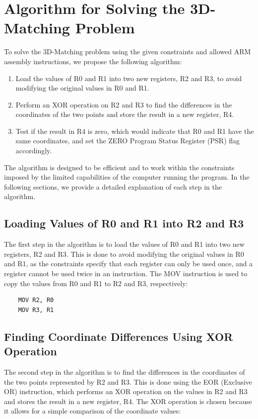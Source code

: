 \section{Algorithm for Solving the 3D-Matching Problem}

To solve the 3D-Matching problem using the given constraints and allowed ARM assembly instructions, we propose the following algorithm:

\begin{enumerate}
    \item Load the values of R0 and R1 into two new registers, R2 and R3, to avoid modifying the original values in R0 and R1.
    \item Perform an XOR operation on R2 and R3 to find the differences in the coordinates of the two points and store the result in a new register, R4.
    \item Test if the result in R4 is zero, which would indicate that R0 and R1 have the same coordinates, and set the ZERO Program Status Register (PSR) flag accordingly.
\end{enumerate}

The algorithm is designed to be efficient and to work within the constraints imposed by the limited capabilities of the computer running the program. In the following sections, we provide a detailed explanation of each step in the algorithm.

\subsection{Loading Values of R0 and R1 into R2 and R3}

The first step in the algorithm is to load the values of R0 and R1 into two new registers, R2 and R3. This is done to avoid modifying the original values in R0 and R1, as the constraints specify that each register can only be used once, and a register cannot be used twice in an instruction. The MOV instruction is used to copy the values from R0 and R1 to R2 and R3, respectively:

\begin{verbatim}
    MOV R2, R0
    MOV R3, R1
\end{verbatim}

\subsection{Finding Coordinate Differences Using XOR Operation}

The second step in the algorithm is to find the differences in the coordinates of the two points represented by R2 and R3. This is done using the EOR (Exclusive OR) instruction, which performs an XOR operation on the values in R2 and R3 and stores the result in a new register, R4. The XOR operation is chosen because it allows for a simple comparison of the coordinate values:

